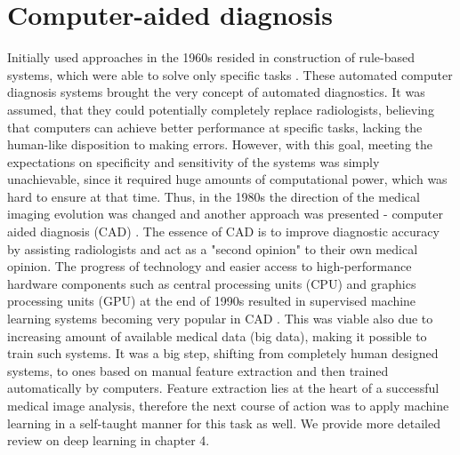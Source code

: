 \section{Computer-aided diagnosis}
Initially used approaches in the 1960s resided in construction of rule-based systems, which were able to solve only specific tasks \cite{surveyOnImageing}. These automated computer diagnosis systems brought the very concept of automated diagnostics. It was assumed, that they could potentially completely replace radiologists, believing that computers can achieve better performance at specific tasks, lacking the human-like disposition to making errors. However, with this goal, meeting the expectations on specificity and sensitivity of the systems was simply unachievable, since it required huge amounts of computational power, which was hard to ensure at that time. Thus, in the 1980s the direction of the medical imaging evolution was changed and another approach was presented - computer aided diagnosis (CAD) \cite{diagnostic50years}. The essence of CAD is to improve diagnostic accuracy by assisting radiologists and act as a "second opinion" \cite{surveyOnImageing, CADinmedicalImaging} to their own medical opinion. 
The progress of technology and easier access to high-performance hardware components such as central processing units (CPU) and graphics processing units (GPU) at the end of 1990s resulted in supervised machine learning systems becoming very popular in CAD \cite{surveyOnImageing}. This was viable also due to increasing amount of available medical data (big data), making it possible to train such systems. It was a big step, shifting from completely human designed systems, to ones based on manual feature extraction and then trained automatically by computers. Feature extraction lies at the heart of a successful medical image analysis, therefore the next course of action was to apply machine learning in a self-taught manner for this task as well. We provide more detailed review on deep learning in chapter 4.

